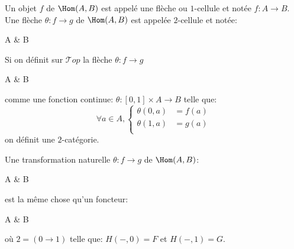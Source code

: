 \documentclass[math, info]{cours}
\begin{document}
\begin{definition}
\begin{enumerate}
	\end{enumerate}
	Un objet $f$ de $\Hom(A, B)$ est appelé une flèche ou $1$-cellule et notée $f: A\to B$.
	Une flèche $\theta : f\to g$ de $\Hom(A, B)$ est appelée $2$-cellule et notée:
	\begin{category}[]
		A\ar[r, "f" name=A, bend left]\ar[r, "g"' name=B, bend right] & B
	\end{category}
	\label{def:2categorie}
\end{definition}

\begin{exemple} Si on définit sur $\mathcal{T}op$ la flèche $\theta: f \to g$
	\begin{category}[]
		A\ar[r, "f" name=A, bend left]\ar[r, "g"' name=B, bend right] & B
	\end{category}
	comme une fonction continue: $\theta: \left[0, 1 \right]\times A \to B$ telle que:
	\begin{equation*}
		\forall a \in A, \begin{cases}
			\theta\left(0, a \right) & = f(a) \\
			\theta\left(1, a \right) & = g(a) \\
		\end{cases}
	\end{equation*}
	on définit une $2$-catégorie.
\end{exemple}

\begin{remarque}
	Une transformation naturelle $\theta : f\to g$ de $\Hom(A, B)$:
	\begin{category}[]
		A\ar[r, "f" name=A, bend left]\ar[r, "g"' name=B, bend right] & B
	\end{category}
	est la même chose qu'un foncteur:
	\begin{category}
		A  \ar[r, "H"] & B
	\end{category}
	où $2 = \left(0 \to 1\right)$ telle que: $H\left(-, 0 \right) = F$ et $H\left(-, 1 \right) = G$.
\end{remarque}
\end{document}
